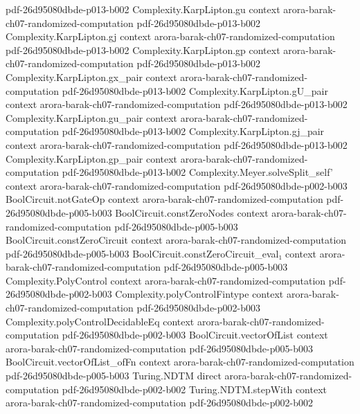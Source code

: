 \begin{theorem}
  {pdf-26d95080dbde-p013-b002}
\proofstep
  {Complexity.KarpLipton.gu}
  {context}
  {arora-barak-ch07-randomized-computation}
  {pdf-26d95080dbde-p013-b002}
\proofstep
  {Complexity.KarpLipton.gj}
  {context}
  {arora-barak-ch07-randomized-computation}
  {pdf-26d95080dbde-p013-b002}
\proofstep
  {Complexity.KarpLipton.gp}
  {context}
  {arora-barak-ch07-randomized-computation}
  {pdf-26d95080dbde-p013-b002}
\proofstep
  {Complexity.KarpLipton.gx_pair}
  {context}
  {arora-barak-ch07-randomized-computation}
  {pdf-26d95080dbde-p013-b002}
\proofstep
  {Complexity.KarpLipton.gU_pair}
  {context}
  {arora-barak-ch07-randomized-computation}
  {pdf-26d95080dbde-p013-b002}
\proofstep
  {Complexity.KarpLipton.gu_pair}
  {context}
  {arora-barak-ch07-randomized-computation}
  {pdf-26d95080dbde-p013-b002}
\proofstep
  {Complexity.KarpLipton.gj_pair}
  {context}
  {arora-barak-ch07-randomized-computation}
  {pdf-26d95080dbde-p013-b002}
\proofstep
  {Complexity.KarpLipton.gp_pair}
  {context}
  {arora-barak-ch07-randomized-computation}
  {pdf-26d95080dbde-p013-b002}
\proofstep
  {Complexity.Meyer.solveSplit_self'}
  {context}
  {arora-barak-ch07-randomized-computation}
  {pdf-26d95080dbde-p002-b003}
\proofstep
  {BoolCircuit.notGateOp}
  {context}
  {arora-barak-ch07-randomized-computation}
  {pdf-26d95080dbde-p005-b003}
\proofstep
  {BoolCircuit.constZeroNodes}
  {context}
  {arora-barak-ch07-randomized-computation}
  {pdf-26d95080dbde-p005-b003}
\proofstep
  {BoolCircuit.constZeroCircuit}
  {context}
  {arora-barak-ch07-randomized-computation}
  {pdf-26d95080dbde-p005-b003}
\proofstep
  {BoolCircuit.constZeroCircuit_eval₁}
  {context}
  {arora-barak-ch07-randomized-computation}
  {pdf-26d95080dbde-p005-b003}
\proofstep
  {Complexity.PolyControl}
  {context}
  {arora-barak-ch07-randomized-computation}
  {pdf-26d95080dbde-p002-b003}
\proofstep
  {Complexity.polyControlFintype}
  {context}
  {arora-barak-ch07-randomized-computation}
  {pdf-26d95080dbde-p002-b003}
\proofstep
  {Complexity.polyControlDecidableEq}
  {context}
  {arora-barak-ch07-randomized-computation}
  {pdf-26d95080dbde-p002-b003}
\proofstep
  {BoolCircuit.vectorOfList}
  {context}
  {arora-barak-ch07-randomized-computation}
  {pdf-26d95080dbde-p005-b003}
\proofstep
  {BoolCircuit.vectorOfList_ofFn}
  {context}
  {arora-barak-ch07-randomized-computation}
  {pdf-26d95080dbde-p005-b003}
\proofstep
  {Turing.NDTM}
  {direct}
  {arora-barak-ch07-randomized-computation}
  {pdf-26d95080dbde-p002-b002}
\proofstep
  {Turing.NDTM.stepWith}
  {context}
  {arora-barak-ch07-randomized-computation}
  {pdf-26d95080dbde-p002-b002}

\end{theorem}
